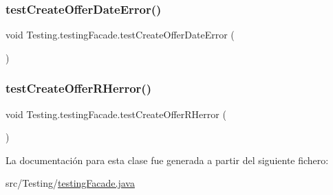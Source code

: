 \subsubsection{\texorpdfstring{testCreateOfferDateError()}{testCreateOfferDateError()}}
{\footnotesize\ttfamily void Testing.\+testing\+Facade.\+test\+Create\+Offer\+Date\+Error (\begin{DoxyParamCaption}{ }\end{DoxyParamCaption})}

\mbox{\label{class_testing_1_1testing_facade_ad01314b0219294b8da854dd42f4e769b}} 
\subsubsection{\texorpdfstring{testCreateOfferRHerror()}{testCreateOfferRHerror()}}
{\footnotesize\ttfamily void Testing.\+testing\+Facade.\+test\+Create\+Offer\+R\+Herror (\begin{DoxyParamCaption}{ }\end{DoxyParamCaption})}



La documentación para esta clase fue generada a partir del siguiente fichero\+:\begin{DoxyCompactItemize}
\item 
src/\+Testing/\mbox{\hyperlink{testing_facade_8java}{testing\+Facade.\+java}}\end{DoxyCompactItemize}
